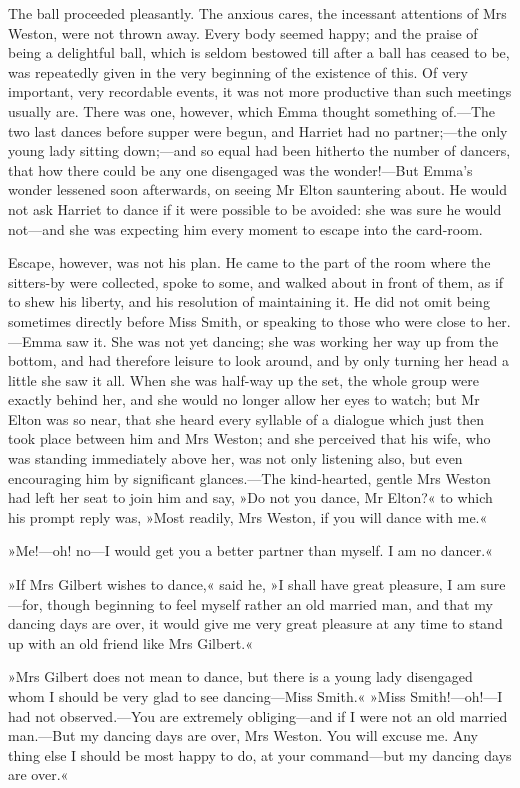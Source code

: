 The ball proceeded pleasantly. The anxious cares, the incessant attentions of Mrs Weston, were not thrown away. Every body seemed happy; and the praise of being a delightful ball, which is seldom bestowed till after a ball has ceased to be, was repeatedly given in the very beginning of the existence of this. Of very important, very recordable events, it was not more productive than such meetings usually are. There was one, however, which Emma thought something of.—The two last dances before supper were begun, and Harriet had no partner;—the only young lady sitting down;—and so equal had been hitherto the number of dancers, that how there could be any one disengaged was the wonder!—But Emma's wonder lessened soon afterwards, on seeing Mr Elton sauntering about. He would not ask Harriet to dance if it were possible to be avoided: she was sure he would not—and she was expecting him every moment to escape into the card-room.

Escape, however, was not his plan. He came to the part of the room where the sitters-by were collected, spoke to some, and walked about in front of them, as if to shew his liberty, and his resolution of maintaining it. He did not omit being sometimes directly before Miss Smith, or speaking to those who were close to her.—Emma saw it. She was not yet dancing; she was working her way up from the bottom, and had therefore leisure to look around, and by only turning her head a little she saw it all. When she was half-way up the set, the whole group were exactly behind her, and she would no longer allow her eyes to watch; but Mr Elton was so near, that she heard every syllable of a dialogue which just then took place between him and Mrs Weston; and she perceived that his wife, who was standing immediately above her, was not only listening also, but even encouraging him by significant glances.—The kind-hearted, gentle Mrs Weston had left her seat to join him and say, »Do not you dance, Mr Elton?« to which his prompt reply was, »Most readily, Mrs Weston, if you will dance with me.«

»Me!—oh! no—I would get you a better partner than myself. I am no dancer.«

»If Mrs Gilbert wishes to dance,« said he, »I shall have great pleasure, I am sure—for, though beginning to feel myself rather an old married man, and that my dancing days are over, it would give me very great pleasure at any time to stand up with an old friend like Mrs Gilbert.«

»Mrs Gilbert does not mean to dance, but there is a young lady disengaged whom I should be very glad to see dancing—Miss Smith.« »Miss Smith!—oh!—I had not observed.—You are extremely obliging—and if I were not an old married man.—But my dancing days are over, Mrs Weston. You will excuse me. Any thing else I should be most happy to do, at your command—but my dancing days are over.«

